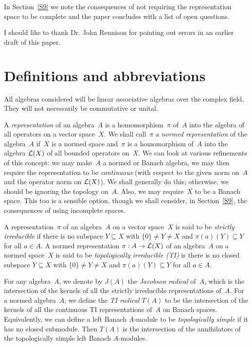\documentclass[11pt]{article}
\newcommand{\sseq}{\subseteq}
\newcommand{\LX}{{\cal L}(X)}
\begin{document}
In Section~\ref{S9} we note the consequences of not requiring the representation
space to be complete and the paper concludes with a list of open questions.

I should like to thank Dr. John Rennison for pointing out errors in an earlier
draft of this paper.
\section{Definitions and abbreviations}\label{S2}

All algebras considered will be linear associative algebras over the complex
field.   They will not necessarily be commutative or unital.

A {\em representation} of an algebra~$A$ is a homomorphism~$\pi$ of~$A$ into the
algebra of all operators on a vector space~$X$.  We shall call~$\pi$ a {\em
normed representation} of the algebra~$A$ if~$X$ is a normed space and~$\pi$ is
a homomorphism of~$A$ into the algebra $\LX$ of all bounded operators on~$X$.
We can look at various refinements of this concept: we may make~$A$ a normed or
Banach algebra, we may then require the representation to be {\em continuous}
(with respect to the given norm on~$A$ and the operator norm on $\LX$).  We
shall generally do this; otherwise, we should be ignoring the topology on~$A$.
Also, we may require~$X$ to be a Banach space.   This too is a sensible option,
though we shall consider, in Section~\ref{S9}, the consequences of using
incomplete spaces.

A representation~$\pi$ of an algebra~$A$ on a vector space~$X$ is said to be
{\em strictly irreducible} if there is no subspace $Y \sseq X$ with $\{0\} \ne Y \ne X$
and $\pi(a)(Y) \sseq Y$ for all $a \in A$.  A normed representation $\pi:A \to
\LX$ of an algebra~$A$ on a normed space~$X$ is said to be {\em topologically
irreducible (TI)} is there is no closed subspace $Y \sseq X$ with $\{0\} \ne Y
\ne X$ and $\pi(a)(Y) \sseq Y$ for all $a \in A$.

For any algebra~$A$, we denote by $J(A)$ the {\em Jacobson radical} of~$A$,
which is the intersection of the kernels of all the strictly irreducible
representations of~$A$.
For a normed algebra~$A$, we define the {\em TI radical} $T(A)$ to be the
intersection of the kernels of all the continuous TI representations of~$A$ on
Banach spaces.
Equivalently, we can define a left Banach $A$-module to be {\em topologically
simple} if it has no closed submodule.    Then $T(A)$ is the intersection of the
annihilators of the topologically simple left Banach $A$-modules.
\end{document}
